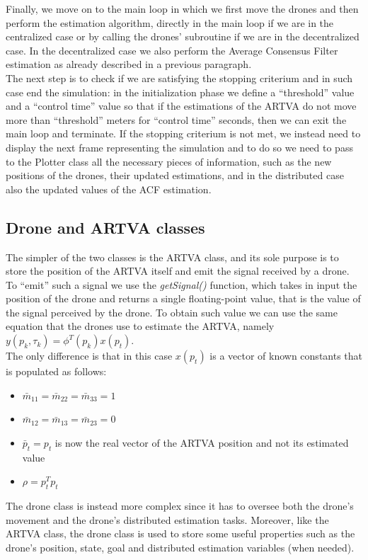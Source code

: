 Finally, we move on to the main loop in which we first move the drones and then perform the estimation algorithm, directly in the main loop if we are in the centralized case or by calling the drones’ subroutine if we are in the decentralized case. In the decentralized case we also perform the Average Consensus Filter estimation as already described in a previous paragraph.\\
The next step is to check if we are satisfying the stopping criterium and in such case end the simulation: in the initialization phase we define a “threshold” value and a “control time” value so that if the estimations of the ARTVA do not move more than “threshold” meters for “control time” seconds, then we can exit the main loop and terminate. If the stopping criterium is not met, we instead need to display the next frame representing the simulation and to do so we need to pass to the Plotter class all the necessary pieces of information, such as the new positions of the drones, their updated estimations, and in the distributed case also the updated values of the ACF estimation. 

\subsection{Drone and ARTVA classes}
The simpler of the two classes is the ARTVA class, and its sole purpose is to store the position of the ARTVA itself and emit the signal received by a drone. To “emit” such a signal we use the \textit{getSignal()} function, which takes in input the position of the drone and returns a single floating-point value, that is the value of the signal perceived by the drone. To obtain such value we can use the same equation that the drones use to estimate the ARTVA, namely $y(p_k,\tau_k) = \phi^T(p_k)x(p_t)$.\\
The only difference is that in this case $x(p_t)$ is a vector of known constants that is populated as follows: 
\begin{itemize}
    \item $\bar{m}_{11} = \bar{m}_{22} = \bar{m}_{33} = 1$
    \item $\bar{m}_{12} = \bar{m}_{13} = \bar{m}_{23} = 0$
    \item $\bar{p}_t = p_t$ is now the real vector of the ARTVA position and not its estimated value
    \item $\rho = p^T_tp_t$
\end{itemize}

The drone class is instead more complex since it has to oversee both the drone’s movement and the drone’s distributed estimation tasks. Moreover, like the ARTVA class, the drone class is used to store some useful properties such as the drone’s position, state, goal and distributed estimation variables (when needed). 

